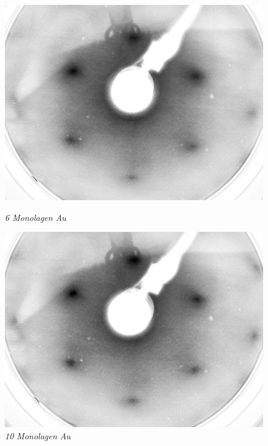 \documentclass{beamer}
\begin{document}
\begin{frame}
\begin{minipage}{\linewidth}
\begin{figure}[H]
	\begin{minipage}[b]{0.3\textwidth}
		\includegraphics[width=\textwidth]{bilder/6ML_E207}
		\caption*{\textit{6 Monolagen Au}}
		\label{6ML} 
	\end{minipage}
	\hfill
	\begin{minipage}[b]{0.3\textwidth} 
		\includegraphics[width=\textwidth]{bilder/10ML_E207}
		\caption*{\textit{10 Monolagen Au}}
		\label{10ML} 
	\end{minipage}
	\hfill
	\begin{minipage}[b]{0.3\textwidth}

\end{minipage}
\end{figure}
\end{minipage}
\end{frame}
\end{document}
